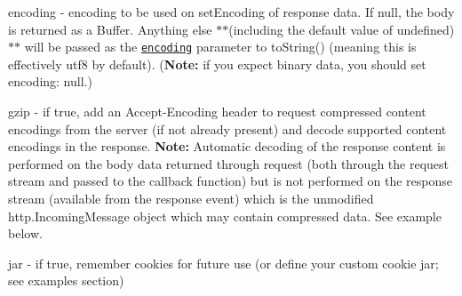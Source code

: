 \begin{DoxyItemize}
\item {\ttfamily encoding} -\/ encoding to be used on {\ttfamily set\+Encoding} of response data. If {\ttfamily null}, the {\ttfamily body} is returned as a {\ttfamily Buffer}. Anything else $\ast$$\ast$(including the default value of {\ttfamily undefined})$\ast$$\ast$ will be passed as the \href{http://nodejs.org/api/buffer.html#buffer_buffer}{\tt encoding} parameter to {\ttfamily to\+String()} (meaning this is effectively {\ttfamily utf8} by default). ({\bfseries Note\+:} if you expect binary data, you should set {\ttfamily encoding\+: null}.)
\item {\ttfamily gzip} -\/ if {\ttfamily true}, add an {\ttfamily Accept-\/\+Encoding} header to request compressed content encodings from the server (if not already present) and decode supported content encodings in the response. {\bfseries Note\+:} Automatic decoding of the response content is performed on the body data returned through {\ttfamily request} (both through the {\ttfamily request} stream and passed to the callback function) but is not performed on the {\ttfamily response} stream (available from the {\ttfamily response} event) which is the unmodified {\ttfamily http.\+Incoming\+Message} object which may contain compressed data. See example below.
\item {\ttfamily jar} -\/ if {\ttfamily true}, remember cookies for future use (or define your custom cookie jar; see examples section) 



\end{DoxyItemize}
